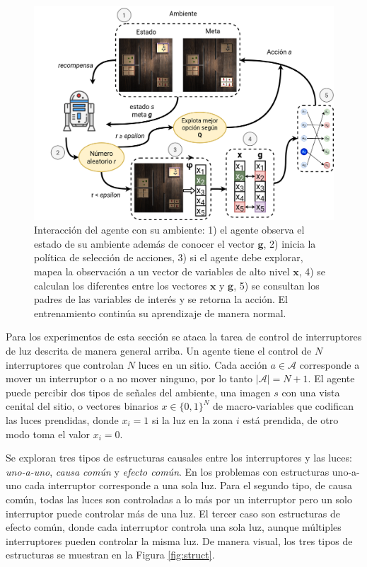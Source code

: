  \begin{figure}
     \centering
     \includegraphics[scale=0.25]{Chapter4/Figs/example_method.png}
     \caption{Interacción del agente con su ambiente: 1) el agente observa el estado de su ambiente además de conocer el vector $\mathbf{g}$, 2) inicia
     la política de selección de acciones, 3) si el agente debe explorar, mapea la observación a un vector de variables de alto nivel $\mathbf{x}$, 4) se calculan los diferentes entre los vectores $\mathbf{x}$ y $\mathbf{g}$, 5) se consultan los padres de las variables de interés y se retorna la acción. El entrenamiento continúa su aprendizaje de manera normal.}
     \label{fig:example-switches}
 \end{figure}
 
Para los experimentos de esta sección se ataca la tarea de control de interruptores de luz descrita de manera general arriba. Un agente tiene el control
de $N$ interruptores que controlan $N$ luces en un sitio.
Cada acción $a\in \mathcal{A}$ corresponde a mover un interruptor o 
a no mover ninguno, por lo tanto $|\mathcal{A}| = N + 1$.
El agente puede percibir dos tipos de señales del ambiente,
una imagen $s$ con una vista cenital del sitio, o vectores binarios $x \in \{0,1\}^N$ de 
macro-variables que codifican las luces prendidas, donde
$x_i = 1$ si la luz en la zona $i$ está prendida, de otro modo 
toma el valor $x_i = 0$.

Se exploran tres tipos de estructuras causales entre los
interruptores y las luces: \textit{uno-a-uno},
\textit{causa común} y \textit{efecto común}.
En los problemas con estructuras uno-a-uno cada interruptor corresponde a una sola luz.
Para el segundo tipo, de causa común, todas
las luces son controladas a lo más por un interruptor pero un
solo interruptor puede controlar más de una luz.
El tercer caso son estructuras de efecto común, donde cada interruptor
controla una sola luz, aunque múltiples interruptores
pueden controlar la misma luz. De manera visual, los tres tipos de estructuras
se muestran en la Figura \ref{fig:struct}.

